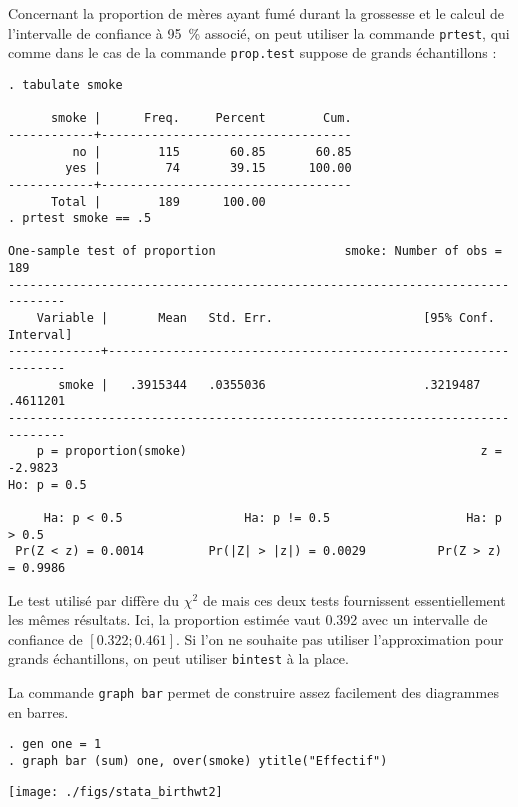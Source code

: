 Concernant la proportion de mères ayant fumé durant la grossesse et
le calcul de l'intervalle de confiance à 95~\% associé, on peut utiliser la
commande \verb|prtest|, qui comme dans le cas de la commande \R
\texttt{prop.test} suppose de grands échantillons :
\begin{verbatim}
. tabulate smoke

      smoke |      Freq.     Percent        Cum.
------------+-----------------------------------
         no |        115       60.85       60.85
        yes |         74       39.15      100.00
------------+-----------------------------------
      Total |        189      100.00
. prtest smoke == .5

One-sample test of proportion                  smoke: Number of obs =      189
------------------------------------------------------------------------------
    Variable |       Mean   Std. Err.                     [95% Conf. Interval]
-------------+----------------------------------------------------------------
       smoke |   .3915344   .0355036                      .3219487    .4611201
------------------------------------------------------------------------------
    p = proportion(smoke)                                         z =  -2.9823
Ho: p = 0.5

     Ha: p < 0.5                 Ha: p != 0.5                   Ha: p > 0.5
 Pr(Z < z) = 0.0014         Pr(|Z| > |z|) = 0.0029          Pr(Z > z) = 0.9986
\end{verbatim}
Le test utilisé par \Stata diffère du $\chi^2$ de \R mais ces deux tests
fournissent essentiellement les mêmes résultats. Ici, la proportion estimée
vaut 0.392 avec un intervalle de confiance de $[0.322;0.461]$. Si l'on ne
souhaite pas utiliser l'approximation pour grands échantillons, on peut
utiliser \verb|bintest| à la place.

La commande \verb|graph bar| permet de construire assez facilement des
diagrammes en barres. 
\begin{verbatim}
. gen one = 1
. graph bar (sum) one, over(smoke) ytitle("Effectif")
\end{verbatim}

\texttt{[image: ./figs/stata\_birthwt2]}

